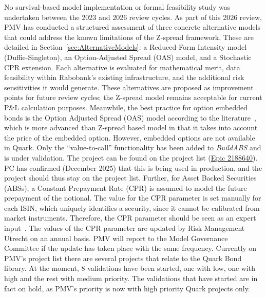 \documentclass[reviewdoc]{pmv_report}  %
\begin{document}
{No survival-based model implementation or formal feasibility study was undertaken between the 2023 and 2026 review cycles.
As part of this 2026 review, PMV has conducted a structured assessment of three concrete alternative models that could address the known limitations of the Z-spread framework.
These are detailed in Section~\ref{sec:AlternativeModels}: a Reduced-Form Intensity model (Duffie-Singleton), an Option-Adjusted Spread (OAS) model, and a Stochastic CPR extension.
Each alternative is evaluated for mathematical merit, data feasibility within Rabobank's existing infrastructure, and the additional risk sensitivities it would generate.
These alternatives are proposed as improvement points for future review cycles; the Z-spread model remains acceptable for current P\&L calculation purposes.
\newline\newline
Meanwhile, the best practice for option embedded bonds is the Option Adjusted Spread (OAS) model according to the literature~\cite{Hayre04}, which is more advanced than Z-spread based model in that it takes into account the price of the embedded option.
However, embedded options are not available in Quark. Only the ``value-to-call'' functionality has been added to \textit{BuildABS} and is under validation.
The project can be found on the project list (\href{https://dev.azure.com/raboweb/PMVProjectList/_workitems/edit/2188640}{Epic 2188640}).
PC has confirmed (December 2025) that this is being used in production, and the project should thus stay on the project list.
\newline\newline
Further, for Asset Backed Securities (ABSs), a Constant Prepayment Rate (CPR) is assumed to model the future prepayment of the notional.
The value for the CPR parameter is set manually for each ISIN, which uniquely identifies a security, since it cannot be calibrated from market instruments.
Therefore, the CPR parameter should be seen as an expert input~\cite{Quark.BondLibrary}.
The values of the CPR parameter are updated by Risk Management Utrecht on an annual basis.
PMV will report to the Model Governance Committee if the update has taken place with the same frequency.
\newline\newline
Currently on PMV's project list there are several projects that relate to the Quark Bond library.
At the moment, 8 validations have been started, one with low, one with high and the rest with medium priority.
The validations that have started are in fact on hold, as PMV's priority is now with high priority Quark projects only.
}
\end{document}
